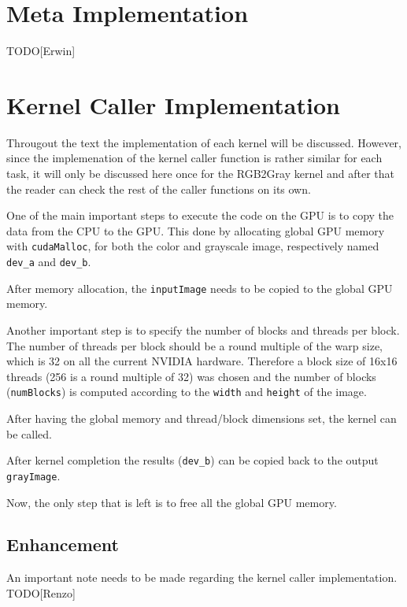 \documentclass[final]{report}
\begin{document}
\section{Meta Implementation}
TODO[Erwin]

\section{Kernel Caller Implementation}
Througout the text the implementation of each kernel will be discussed.
However, since the implemenation of the kernel caller function is rather similar for each task, it will only be discussed here once for the RGB2Gray kernel and after that the reader can check the rest of the caller functions on its own.

One of the main important steps to execute the code on the GPU is to copy the data from the CPU to the GPU.
This done by allocating global GPU memory with \texttt{cudaMalloc}, for both the color and grayscale image, respectively named \texttt{dev\_a} and \texttt{dev\_b}.

After memory allocation, the \texttt{inputImage} needs to be copied to the global GPU memory.


Another important step is to specify the number of blocks and threads per block.
The number of threads per block should be a round multiple of the warp size, which is 32 on all the current NVIDIA hardware.
Therefore a block size of 16x16 threads (256 is a round multiple of 32) was chosen and the number of blocks (\texttt{numBlocks}) is computed according to the \texttt{width} and \texttt{height} of the image.


After having the global memory and thread/block dimensions set, the kernel can be called.


After kernel completion the results (\texttt{dev\_b}) can be copied back to the output \texttt{grayImage}.


Now, the only step that is left is to free all the global GPU memory.

\subsection{Enhancement}
An important note needs to be made regarding the kernel caller implementation. TODO[Renzo]
\end{document}

